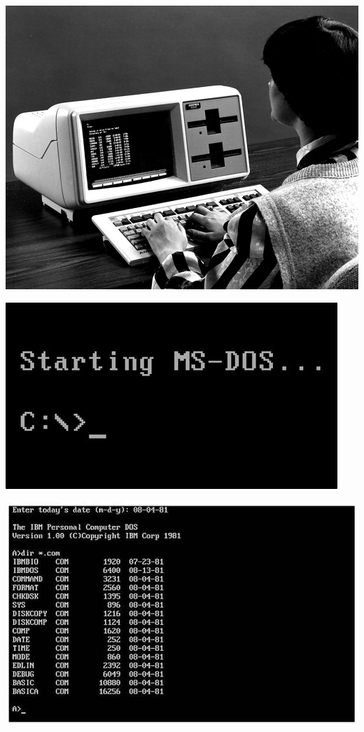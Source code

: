 \begin{center}
	\includegraphics[height=.9\textheight]{./IMG/MSDOS-3247283636.jpg}
\end{center}

\vfill
\pagebreak

\begin{center}
	\includegraphics[height=\textheight]{./IMG/th-2938318034.jpg}
\end{center}

\vfill
\pagebreak

	\begin{center}
	\includegraphics[height=\textheight]{./IMG/960x540-989094356.jpg}
\end{center}

